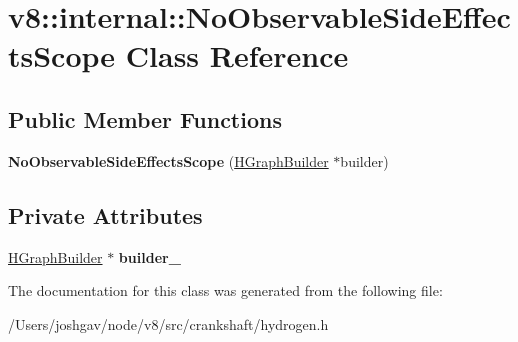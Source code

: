 \hypertarget{classv8_1_1internal_1_1_no_observable_side_effects_scope}{}\section{v8\+:\+:internal\+:\+:No\+Observable\+Side\+Effects\+Scope Class Reference}
\label{classv8_1_1internal_1_1_no_observable_side_effects_scope}
\subsection*{Public Member Functions}
\begin{DoxyCompactItemize}
\item 
{\bfseries No\+Observable\+Side\+Effects\+Scope} (\hyperlink{classv8_1_1internal_1_1_h_graph_builder}{H\+Graph\+Builder} $\ast$builder)\hypertarget{classv8_1_1internal_1_1_no_observable_side_effects_scope_a93ae238cc4bf59510216b8ca3eb4f8b8}{}\label{classv8_1_1internal_1_1_no_observable_side_effects_scope_a93ae238cc4bf59510216b8ca3eb4f8b8}

\end{DoxyCompactItemize}
\subsection*{Private Attributes}
\begin{DoxyCompactItemize}
\item 
\hyperlink{classv8_1_1internal_1_1_h_graph_builder}{H\+Graph\+Builder} $\ast$ {\bfseries builder\+\_\+}\hypertarget{classv8_1_1internal_1_1_no_observable_side_effects_scope_aa6f55bfd09ab9ad7afffb73f445a0c96}{}\label{classv8_1_1internal_1_1_no_observable_side_effects_scope_aa6f55bfd09ab9ad7afffb73f445a0c96}

\end{DoxyCompactItemize}


The documentation for this class was generated from the following file\+:\begin{DoxyCompactItemize}
\item 
/\+Users/joshgav/node/v8/src/crankshaft/hydrogen.\+h\end{DoxyCompactItemize}
